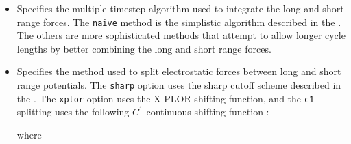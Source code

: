 \begin{itemize}

\item
{}
{Specifies the multiple timestep algorithm used to integrate the 
long and short range forces.  The \verb!naive! method is the simplistic algorithm described in 
the \PG.  The others are more sophisticated methods that attempt 
to allow longer cycle lengths by better combining the long and short range forces.}

\item
{}
{Specifies the method used to split electrostatic forces between long 
and short range potentials.  
The \verb!sharp! option uses the sharp cutoff scheme described in the \PG.  
The \verb!xplor! option uses the X-PLOR shifting function, 
and the \verb!c1! splitting uses 
the following $C^1$ continuous shifting 
function :  
}
where

\end{itemize}

